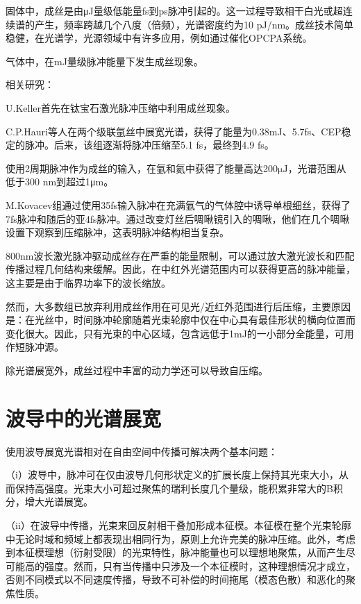 \documentclass[14pt,a4paper,oneside]{article}
\numberwithin{equation}{subsection}             %
\numberwithin{figure}{subsection}               %
\begin{document}
固体中，成丝是由μJ量级低能量fs到ps脉冲引起的。这一过程导致相干白光或超连续谱的产生，频率跨越几个八度（倍频），光谱密度约为10 pJ/nm。成丝技术简单稳健，在光谱学，光源领域中有许多应用，例如通过催化OPCPA系统。

气体中，在mJ量级脉冲能量下发生成丝现象。

相关研究：

U.Keller首先在钛宝石激光脉冲压缩中利用成丝现象。\cite{hauriGenerationIntenseCarrierenvelope2004}

C.P.Hauri等人在两个级联氩丝中展宽光谱，获得了能量为0.38mJ、5.7fs、CEP稳定的脉冲。后来，该组逐渐将脉冲压缩至5.1 fs，最终到4.9 fs。\cite{hauriGenerationIntenseFewcycle2005, zairSpatiotemporalCharacterizationFewcycle2007}

使用2周期脉冲作为成丝的输入，在氩\cite{akozbekExtendingSupercontinuumSpectrum2006}和氦\cite{goulielmakisUltrabroadbandCoherentLight2008}中获得了能量高达200$\mathrm{\mu J}$，光谱范围从低于300 nm到超过1μm。

M.Kovacev组通过使用35fs输入脉冲在充满氩气的气体腔中诱导单根细丝，获得了7fs脉冲和随后的亚4fs脉冲。通过改变灯丝后啁啾镜引入的啁啾，他们在几个啁啾设置下观察到压缩脉冲，这表明脉冲结构相当复杂。\cite{steingrubeSub15cyclePulsesSingle2012}

800nm波长激光脉冲驱动成丝存在严重的能量限制，可以通过放大激光波长和匹配传播过程几何结构来缓解。因此，在中红外光谱范围内可以获得更高的脉冲能量，这主要是由于临界功率下的波长缩放。\cite{heylScaleinvariantNonlinearOptics2016, zheltikovLaserinducedFilamentsMidinfrared2017}

然而，大多数组已放弃利用成丝作用在可见光/近红外范围进行后压缩，主要原因是：在光丝中，时间脉冲轮廓随着光束轮廓中仅在中心具有最佳形状的横向位置而变化很大。因此，只有光束的中心区域，包含远低于1mJ的一小部分全能量，可用作短脉冲源。

除光谱展宽外，成丝过程中丰富的动力学还可以导致自压缩。

\section{波导中的光谱展宽}

使用波导展宽光谱相对在自由空间中传播可解决两个基本问题：

（i）波导中，脉冲可在仅由波导几何形状定义的扩展长度上保持其光束大小，从而保持高强度。光束大小可超过聚焦的瑞利长度几个量级，能积累非常大的B积分，增大光谱展宽。

（ii）在波导中传播，光束来回反射相干叠加形成本征模。本征模在整个光束轮廓中无论时域和频域上都表现出相同行为，原则上允许完美的脉冲压缩。此外，考虑到本征模理想（衍射受限）的光束特性，脉冲能量也可以理想地聚焦，从而产生尽可能高的强度。然而，只有当传播中只涉及一个本征模时，这种理想情况才成立，否则不同模式以不同速度传播，导致不可补偿的时间拖尾（模态色散）和恶化的聚焦性质。
\end{document}
